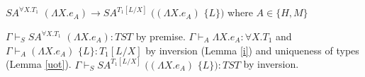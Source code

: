 \begin{case}
$SA^{\forall X.T_{1}}$ $(\Lambda X.e_{A})\rightarrow SA^{T_{1}[L/X]}$ $((\Lambda X.e_{A})$ $\lbrace L\rbrace)$ where $A\in\lbrace H,M\rbrace$

$\Gamma\vdash_{S}SA^{\forall X.T_{1}}$ $(\Lambda X.e_{A}):TST$ by premise.  $\Gamma\vdash_{A}\Lambda X.e_{A}:\forall X.T_{1}$ and $\Gamma\vdash_{A}(\Lambda X.e_{A})$ $\lbrace L\rbrace:T_{1}[L/X]$ by inversion (Lemma \ref{i}) and uniqueness of types (Lemma \ref{uot}).  $\Gamma\vdash_{S}SA^{T_{1}[L/X]}$ $((\Lambda X.e_{A})$ $\lbrace L\rbrace):TST$ by inversion.
\end{case}